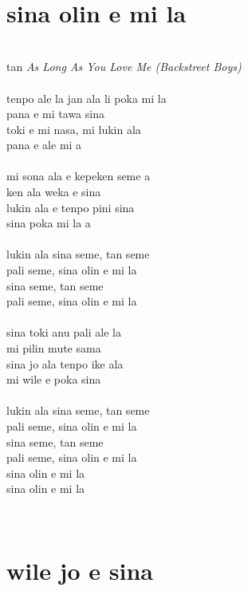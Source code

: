 \documentclass[a4paper]{amsbook}
\begin{document}
~\\

\section{sina olin e mi la}

\begin{center}
~\\
tan {\itshape As Long As You Love Me (Backstreet Boys)}\\
~\\
tenpo ale la jan ala li poka mi la\\
pana e mi tawa sina\\
toki e mi nasa, mi lukin ala\\
pana e ale mi a\\
~\\
mi sona ala e kepeken seme a\\
ken ala weka e sina\\
lukin ala e tenpo pini sina\\
sina poka mi la a\\
~\\
lukin ala sina seme, tan seme\\
pali seme, sina olin e mi la\\
sina seme, tan seme\\
pali seme, sina olin e mi la\\
~\\
sina toki anu pali ale la\\
mi pilin mute sama\\
sina jo ala tenpo ike ala\\
mi wile e poka sina\\
~\\
lukin ala sina seme, tan seme\\
pali seme, sina olin e mi la\\
sina seme, tan seme\\
pali seme, sina olin e mi la\\
sina olin e mi la\\
sina olin e mi la\\
\end{center}

~\\

\section{wile jo e sina}
\end{document}
